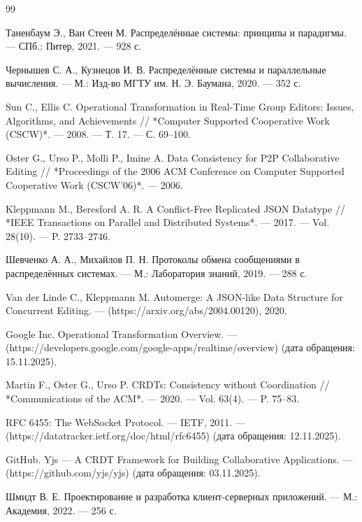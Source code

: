 
\begin{thebibliography}{99}

Таненбаум Э., Ван Стеен М.  
Распределённые системы: принципы и парадигмы. — СПб.: Питер, 2021. — 928 с.

Чернышев С. А., Кузнецов И. В.  
Распределённые системы и параллельные вычисления. — М.: Изд-во МГТУ им. Н. Э. Баумана, 2020. — 352 с.

Sun C., Ellis C.  
Operational Transformation in Real-Time Group Editors: Issues, Algorithms, and Achievements // *Computer Supported Cooperative Work (CSCW)*. — 2008. — Т. 17. — С. 69–100.

Oster G., Urso P., Molli P., Imine A.  
Data Consistency for P2P Collaborative Editing // *Proceedings of the 2006 ACM Conference on Computer Supported Cooperative Work (CSCW’06)*. — 2006.

Kleppmann M., Beresford A. R.  
A Conflict-Free Replicated JSON Datatype // *IEEE Transactions on Parallel and Distributed Systems*. — 2017. — Vol. 28(10). — P. 2733–2746.

Шевченко А. А., Михайлов П. Н.  
Протоколы обмена сообщениями в распределённых системах. — М.: Лаборатория знаний, 2019. — 288 с.

Van der Linde C., Kleppmann M.  
Automerge: A JSON-like Data Structure for Concurrent Editing. — (https://arxiv.org/abs/2004.00120), 2020.

Google Inc.  
Operational Transformation Overview. — (https://developers.google.com/google-apps/realtime/overview) (дата обращения: 15.11.2025).

Martin F., Oster G., Urso P.  
CRDTs: Consistency without Coordination // *Communications of the ACM*. — 2020. — Vol. 63(4). — P. 75–83.

RFC 6455: The WebSocket Protocol. — IETF, 2011. — (https://datatracker.ietf.org/doc/html/rfc6455) (дата обращения: 12.11.2025).

GitHub.  
Yjs — A CRDT Framework for Building Collaborative Applications. — (https://github.com/yjs/yjs) (дата обращения: 03.11.2025).

Шмидт В. Е.  
Проектирование и разработка клиент-серверных приложений. — М.: Академия, 2022. — 256 с.

\end{thebibliography}